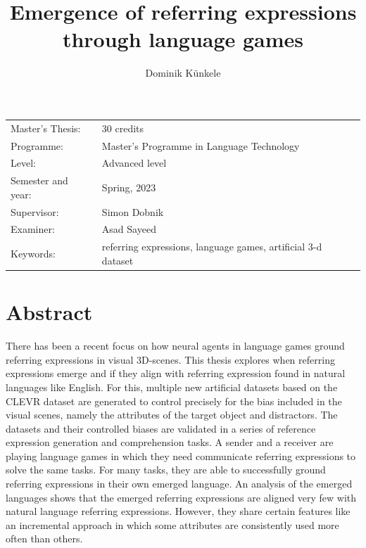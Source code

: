 \documentclass[11pt, a4paper]{article}
\title{Emergence of referring expressions through language games}
\author{Dominik Künkele}
\begin{document}
\begin{titlepage}

    \maketitle

    \vfill

    \begingroup
    \renewcommand*{\arraystretch}{1.2}
    \begin{tabular}{l@{\hskip 20mm}l}
        \hline
        Master's Thesis:   & 30 credits                                                    \\
        Programme:         & Master’s Programme in Language Technology                     \\
        Level:             & Advanced level                                                \\
        Semester and year: & Spring, 2023                                                  \\
        Supervisor:        & Simon Dobnik                                                  \\
        Examiner:          & Asad Sayeed                                                   \\
        Keywords:          & referring expressions, language games, artificial 3-d dataset
    \end{tabular}
    \endgroup

    \thispagestyle{empty}
\end{titlepage}

\newpage
\singlespacing
\section*{Abstract}
There has been a recent focus on how neural agents in language games ground referring expressions in visual 3D-scenes.
This thesis explores when referring expressions emerge and if they align with referring expression found in natural languages like English.
For this, multiple new artificial datasets  based on the CLEVR dataset are generated to control precisely for the bias included in the visual scenes, namely the attributes of the target object and distractors.
The datasets and their controlled biases are validated in a series of reference expression generation and comprehension tasks.
A sender and a receiver are playing language games in which they need communicate referring expressions to solve the same tasks.
For many tasks, they are able to successfully ground referring expressions in their own emerged language.
An analysis of the emerged languages shows that the emerged referring expressions are aligned very few with natural language referring expressions.
However, they share certain features like an incremental approach in which some attributes are consistently used more often than others.
\end{document}
